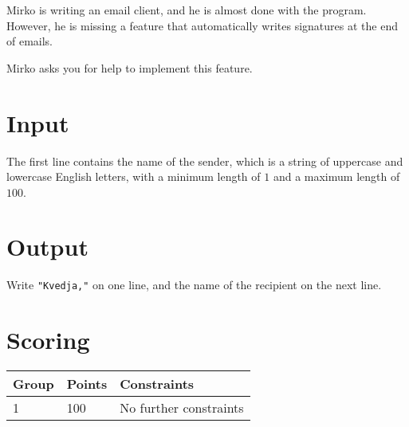 
Mirko is writing an email client, and he is almost done with the program.
However, he is missing a feature that automatically writes signatures at the end of emails.

Mirko asks you for help to implement this feature.

\section*{Input}
The first line contains the name of the sender, which is a string of uppercase and lowercase English letters, with a minimum length of $1$ and a maximum length of $100$.

\section*{Output}
Write \texttt{"Kvedja,"} on one line, and the name of the recipient on the next line.

\section*{Scoring}
\begin{tabular}{|l|l|l|}
\hline
Group & Points & Constraints \\ \hline
1     & 100   & No further constraints \\ \hline
\end{tabular}
